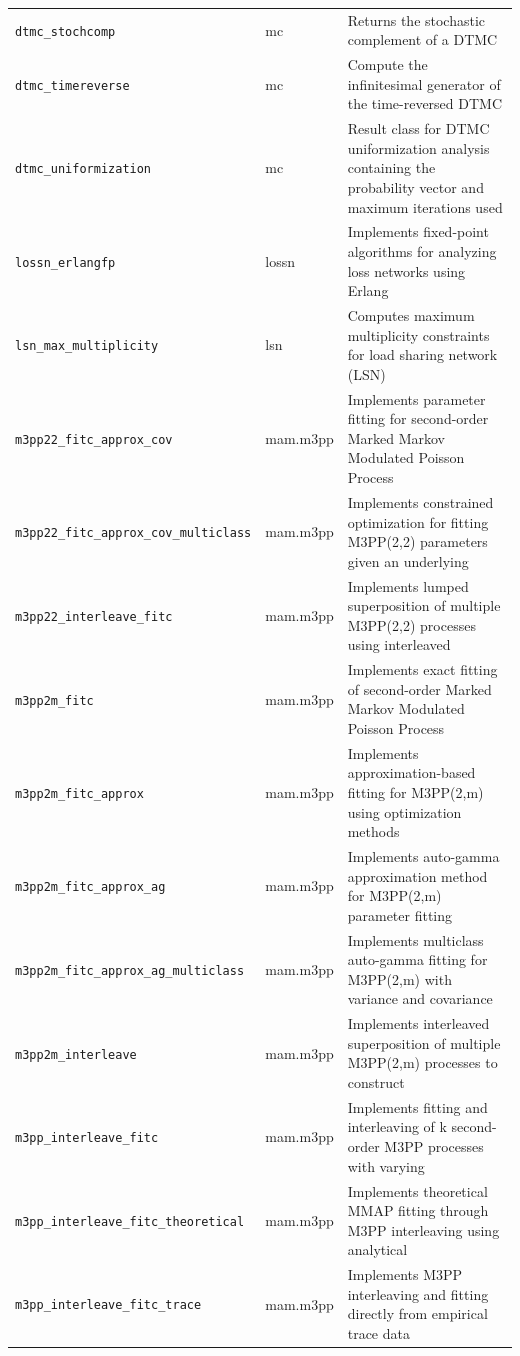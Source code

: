 \begin{footnotesize}
\begin{longtable}{|p{0.4\linewidth}|p{0.1\linewidth}|p{0.5\linewidth}|}
\texttt{dtmc\_stochcomp} & mc & Returns the stochastic complement of a DTMC\\
\texttt{dtmc\_timereverse} & mc & Compute the infinitesimal generator of the time-reversed DTMC\\
\texttt{dtmc\_uniformization} & mc & Result class for DTMC uniformization analysis containing the probability vector and maximum iterations used\\
\texttt{lossn\_erlangfp} & lossn & Implements fixed-point algorithms for analyzing loss networks using Erlang\\
\texttt{lsn\_max\_multiplicity} & lsn & Computes maximum multiplicity constraints for load sharing network (LSN)\\
\texttt{m3pp22\_fitc\_approx\_cov} & mam.m3pp & Implements parameter fitting for second-order Marked Markov Modulated Poisson Process\\
\texttt{m3pp22\_fitc\_approx\_cov\_multiclass} & mam.m3pp & Implements constrained optimization for fitting M3PP(2,2) parameters given an underlying\\
\texttt{m3pp22\_interleave\_fitc} & mam.m3pp & Implements lumped superposition of multiple M3PP(2,2) processes using interleaved\\
\texttt{m3pp2m\_fitc} & mam.m3pp & Implements exact fitting of second-order Marked Markov Modulated Poisson Process\\
\texttt{m3pp2m\_fitc\_approx} & mam.m3pp & Implements approximation-based fitting for M3PP(2,m) using optimization methods\\
\texttt{m3pp2m\_fitc\_approx\_ag} & mam.m3pp & Implements auto-gamma approximation method for M3PP(2,m) parameter fitting\\
\texttt{m3pp2m\_fitc\_approx\_ag\_multiclass} & mam.m3pp & Implements multiclass auto-gamma fitting for M3PP(2,m) with variance and covariance\\
\texttt{m3pp2m\_interleave} & mam.m3pp & Implements interleaved superposition of multiple M3PP(2,m) processes to construct\\
\texttt{m3pp\_interleave\_fitc} & mam.m3pp & Implements fitting and interleaving of k second-order M3PP processes with varying\\
\texttt{m3pp\_interleave\_fitc\_theoretical} & mam.m3pp & Implements theoretical MMAP fitting through M3PP interleaving using analytical\\
\texttt{m3pp\_interleave\_fitc\_trace} & mam.m3pp & Implements M3PP interleaving and fitting directly from empirical trace data\\

\end{longtable}
\end{footnotesize}
